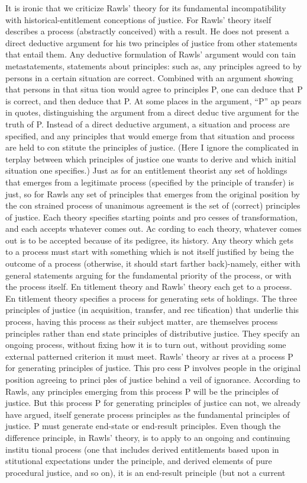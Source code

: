 \documentclass[11pt,openany]{book}
\begin{document}
It is ironic that we criticize Rawls' theory for its fundamental incompatibility with historical-entitlement conceptions of justice. For Rawls' theory itself describes a process (abstractly conceived) with a result. He does not present a direct deductive argument for his two principles of justice from other statements that entail them. Any deductive formulation of Rawls' argument would con tain metastatements, statements about principles: such as, any principles agreed to by persons in a certain situation are correct. Combined with an argument showing that persons in that situa tion would agree to principles P, one can deduce that P is correct, and then deduce that P. At some places in the argument, ``P'' ap pears in quotes, distinguishing the argument from a direct deduc tive argument for the truth of P. Instead of a direct deductive argument, a situation and process are specified, and any principles that would emerge from that situation and process are held to con stitute the principles of justice. (Here I ignore the complicated in terplay between which principles of justice one wants to derive and which initial situation one specifies.) Just as for an entitlement theorist any set of holdings that emerges from a legitimate process (specified by the principle of transfer) is just, so for Rawls any set of principles that emerges from the original position by the con strained process of unanimous agreement is the set of (correct) principles of justice. Each theory specifies starting points and pro cesses of transformation, and each accepts whatever comes out. Ac cording to each theory, whatever comes out is to be accepted because of its pedigree, its history. Any theory which gets to a process must start with something which is not itself justified by being the outcome of a process (otherwise, it should start farther back)-namely, either with general statements arguing for the fundamental priority of the process, or with the process itself. En titlement theory and Rawls' theory each get to a process. En titlement theory specifies a process for generating sets of holdings. The three principles of justice (in acquisition, transfer, and rec tification) that underlie this process, having this process as their subject matter, are themselves process principles rather than end state principles of distributive justice. They specify an ongoing process, without fixing how it is to turn out, without providing some external patterned criterion it must meet. Rawls' theory ar rives at a process P for generating principles of justice. This pro cess P involves people in the original position agreeing to princi ples of justice behind a veil of ignorance. According to Rawls, any principles emerging from this process P will be the principles of justice. But this process P for generating principles of justice can not, we already have argued, itself generate process principles as the fundamental principles of justice. P must generate end-state or end-result principles. Even though the difference principle, in Rawls' theory, is to apply to an ongoing and continuing institu tional process (one that includes derived entitlements based upon in stitutional expectations under the principle, and derived elements of pure procedural justice, and so on), it is an end-result principle (but not a current 
\end{document}
